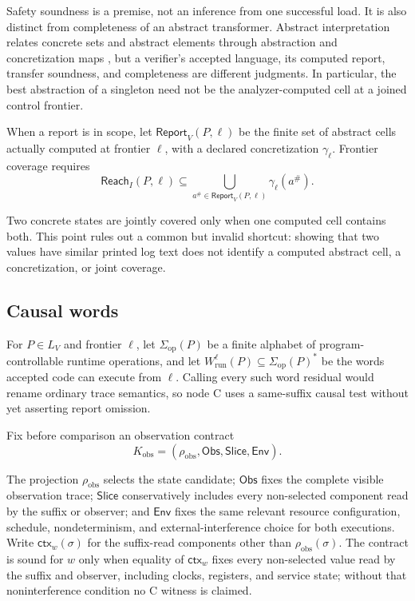 \documentclass[conference]{IEEEtran}
\begin{document}
Safety soundness is a premise, not an inference from one successful load. It is also distinct from completeness of an abstract transformer. Abstract interpretation relates concrete sets and abstract elements through abstraction and concretization maps \cite{ref5}, but a verifier's accepted language, its computed report, transfer soundness, and completeness are different judgments. In particular, the best abstraction of a singleton need not be the analyzer-computed cell at a joined control frontier.

When a report is in scope, let $\mathsf{Report}_V(P,\ell)$ be the finite set of abstract cells actually computed at frontier $\ell$, with a declared concretization $\gamma_\ell$. Frontier coverage requires
\begin{equation}
\mathsf{Reach}_I(P,\ell)
\subseteq
\bigcup_{a^\#\in\mathsf{Report}_V(P,\ell)}\gamma_\ell(a^\#).
\end{equation}

Two concrete states are jointly covered only when one computed cell contains both. This point rules out a common but invalid shortcut: showing that two values have similar printed log text does not identify a computed abstract cell, a concretization, or joint coverage.

\subsection{Causal words}

For $P\in L_V$ and frontier $\ell$, let $\Sigma_{\mathrm{op}}(P)$ be a finite alphabet of program-controllable runtime operations, and let $W^\ell_{\mathrm{run}}(P)\subseteq\Sigma_{\mathrm{op}}(P)^*$ be the words accepted code can execute from $\ell$. Calling every such word residual would rename ordinary trace semantics, so node C uses a same-suffix causal test without yet asserting report omission.

Fix before comparison an observation contract
\begin{equation}
K_{\mathrm{obs}}=(\rho_{\mathrm{obs}},\mathsf{Obs},\mathsf{Slice},\mathsf{Env}).
\end{equation}

The projection $\rho_{\mathrm{obs}}$ selects the state candidate; $\mathsf{Obs}$ fixes the complete visible observation trace; $\mathsf{Slice}$ conservatively includes every non-selected component read by the suffix or observer; and $\mathsf{Env}$ fixes the same relevant resource configuration, schedule, nondeterminism, and external-interference choice for both executions. Write $\mathsf{ctx}_w(\sigma)$ for the suffix-read components other than $\rho_{\mathrm{obs}}(\sigma)$. The contract is sound for $w$ only when equality of $\mathsf{ctx}_w$ fixes every non-selected value read by the suffix and observer, including clocks, registers, and service state; without that noninterference condition no C witness is claimed.
\end{document}
